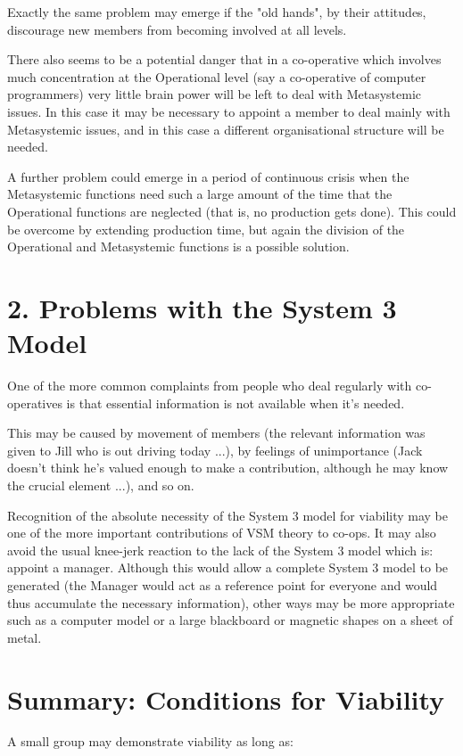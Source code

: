 Exactly the same problem may emerge if the "old hands", by their attitudes, discourage new members from becoming involved at all levels.

There also seems to be a potential danger that in a co-operative which involves much concentration at the Operational level (say a co-operative of computer programmers) very little brain power will be left to deal with Metasystemic issues. In this case it may be necessary to appoint a member to deal mainly with Metasystemic issues, and in this case a different organisational structure will be needed.

A further problem could emerge in a period of continuous crisis when the Metasystemic functions need such a large amount of the time that the Operational functions are neglected (that is, no production gets done). This could be overcome by extending production time, but again the division of the Operational and Metasystemic functions is a possible solution.

\section*{2. Problems with the System 3 Model}
One of the more common complaints from people who deal regularly with co-operatives is that essential information is not available when it's needed.

This may be caused by movement of members (the relevant information was given to Jill who is out driving today ...), by feelings of unimportance (Jack doesn't think he's valued enough to make a contribution, although he may know the crucial element ...), and so on.

Recognition of the absolute necessity of the System 3 model for viability may be one of the more important contributions of VSM theory to co-ops. It may also avoid the usual knee-jerk reaction to the lack of the System 3 model which is: appoint a manager. Although this would allow a complete System 3 model to be generated (the Manager would act as a reference point for everyone and would thus accumulate the necessary information), other ways may be more appropriate such as a computer model or a large blackboard or magnetic shapes on a sheet of metal.

\section*{Summary: Conditions for Viability}
A small group may demonstrate viability as long as:


